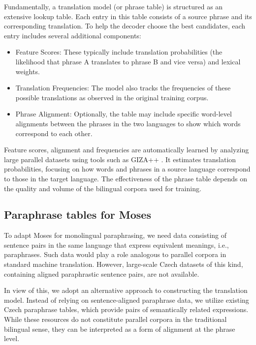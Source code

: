Fundamentally, a translation model (or phrase table) is structured as an extensive lookup table. Each entry in this table consists of a source phrase and its corresponding translation. To help the decoder choose the best candidates, each entry includes several additional components:

\begin{itemize}
    \item Feature Scores: These typically include translation probabilities (the likelihood that phrase A translates to phrase B and vice versa) and lexical weights.
    \item Translation Frequencies: The model also tracks the frequencies of these possible translations as observed in the original training corpus.
    \item Phrase Alignment: Optionally, the table may include specific word-level alignments between the phrases in the two languages to show which words correspond to each other.
\end{itemize}

Feature scores, alignment and frequencies are automatically learned by analyzing large parallel datasets using tools such as GIZA++ \citep{gizapp}. It estimates translation probabilities, focusing on how words and phrases in a source language correspond to those in the target language. The effectiveness of the phrase table depends on the quality and volume of the bilingual corpora used for training. 


\subsection{Paraphrase tables for Moses}
\label{sect-PhraseModel}
To adapt Moses for monolingual paraphrasing, we need data consisting of sentence pairs in the same language that express equivalent meanings, i.e., paraphrases. Such data would play a role analogous to parallel corpora in standard machine translation. However, large-scale Czech datasets of this kind, containing aligned paraphrastic sentence pairs, are not available.

In view of this, we adopt an alternative approach to constructing the translation model. Instead of relying on sentence-aligned paraphrase data, we utilize existing Czech paraphrase tables, which provide pairs of semantically related expressions. While these resources do not constitute parallel corpora in the traditional bilingual sense, they can be interpreted as a form of alignment at the phrase level.


